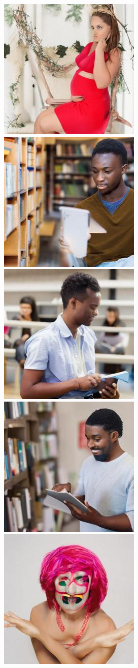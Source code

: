 \begin{figure}[h!]
\begin{subfigure}[t]{0.32\linewidth}
    	\includegraphics[width=0.32\linewidth]{figs/samples_appendix_4/base_cfg_2_ode_prompt_16_image_2.jpg}\\ 
    	\includegraphics[width=0.32\linewidth]{figs/samples_appendix_4/base_cfg_2_ode_prompt_17_image_0.jpg}\;%
    	\includegraphics[width=0.32\linewidth]{figs/samples_appendix_4/base_cfg_2_ode_prompt_17_image_1.jpg}\;%
    	\includegraphics[width=0.32\linewidth]{figs/samples_appendix_4/base_cfg_2_ode_prompt_17_image_2.jpg}\\ 
    	\includegraphics[width=0.32\linewidth]{figs/samples_appendix_4/base_cfg_2_ode_prompt_21_image_0.jpg}\;%

\end{subfigure}
\end{figure}
